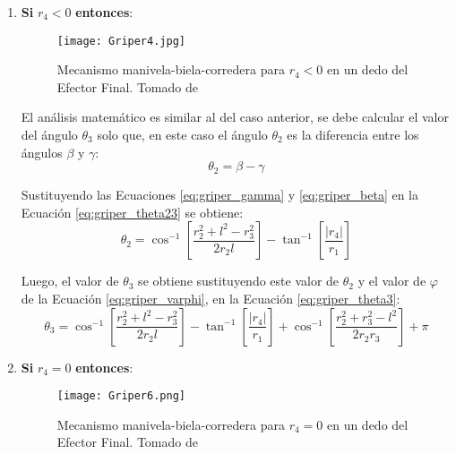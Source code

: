\begin{enumerate}
\item \textbf{Si} $r_4<0$ \textbf{entonces}:
\begin{figure}[htb]
    \centering
     \texttt{[image: Griper4.jpg]}
    \caption [Mecanismo manivela-biela-corredera para $r_4<0$ en un dedo del Efector Final.]{Mecanismo manivela-biela-corredera para $r_4<0$ en un dedo del Efector Final. Tomado de \cite{zapata_zapata_control_2017} }
    \label{fig:Griper_MBC2}
\end{figure}

El análisis matemático es similar al del caso anterior, se debe calcular el valor del ángulo $\theta_3$ solo que, en este caso el ángulo $\theta_2$ es la diferencia entre los ángulos $\beta$ y $\gamma$:
\begin{equation}\label{eq:griper_theta23}
\theta_2=\beta-\gamma
\end{equation}

Sustituyendo las Ecuaciones \ref{eq:griper_gamma} y \ref{eq:griper_beta} en la Ecuación \ref{eq:griper_theta23} se obtiene:
\begin{equation}\label{eq:griper_theta24}
\theta_2=  \cos^{-1}\left[  \frac{r^2_2 +l^2-r^2_3}{2r_2l}\right]- \tan^{-1}\left[  \frac{|r_4|}{r_1}\right]
\end{equation}

Luego, el valor de $\theta_3$ se obtiene sustituyendo este valor de $\theta_2$  y el valor de $\varphi$ de la Ecuación \ref{eq:griper_varphi},  en la Ecuación \ref{eq:griper_theta3}:
\begin{equation}\label{eq:griper_theta34}
\theta_3= \cos^{-1}\left[  \frac{r^2_2 +l^2-r^2_3}{2r_2l}\right]- \tan^{-1}\left[  \frac{|r_4|}{r_1}\right]+\cos^{-1}\left[ \frac{r^2_2 +r^2_3-l^2}{2r_2r_3}\right]+\pi
\end{equation}

\item \textbf{Si} $r_4=0$ \textbf{entonces}:
\begin{figure}[htb]
    \centering
     \texttt{[image: Griper6.png]}
    \caption[Mecanismo manivela-biela-corredera para $r_4 =0$ en un dedo del Efector Final.]{Mecanismo manivela-biela-corredera para $r_4 =0$ en un dedo del Efector Final. Tomado de \cite{zapata_zapata_control_2017} }
    \label{fig:Griper_MBC3}
\end{figure}


\end{enumerate}
